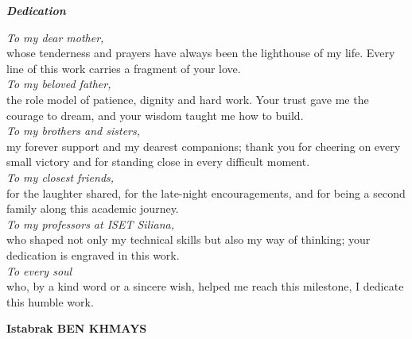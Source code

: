 
\thispagestyle{empty}
\vspace*{1cm}

\begin{center}
{\Huge\bfseries\color{primary}\itshape Dedication}\\[0.4cm]
\end{center}

\vspace{1cm}

\begin{center}
\itshape\large
\begin{minipage}{0.80\textwidth}

\textit{To my dear mother,}\\
whose tenderness and prayers have always been the lighthouse of my life. Every line of this work carries a fragment of your love.\\[0.5cm]

\textit{To my beloved father,}\\
the role model of patience, dignity and hard work. Your trust gave me the courage to dream, and your wisdom taught me how to build.\\[0.5cm]

\textit{To my brothers and sisters,}\\
my forever support and my dearest companions; thank you for cheering on every small victory and for standing close in every difficult moment.\\[0.5cm]

\textit{To my closest friends,}\\
for the laughter shared, for the late-night encouragements, and for being a second family along this academic journey.\\[0.5cm]

\textit{To my professors at ISET Siliana,}\\
who shaped not only my technical skills but also my way of thinking; your dedication is engraved in this work.\\[0.5cm]

\textit{To every soul}\\
who, by a kind word or a sincere wish, helped me reach this milestone, I dedicate this humble work.

\vspace{1cm}
\hfill\textbf{Istabrak BEN KHMAYS}
\end{minipage}
\end{center}

\cleardoublepage
